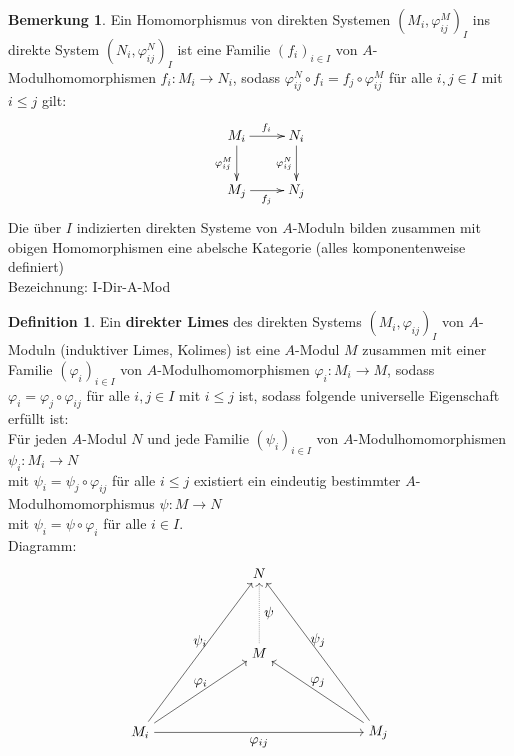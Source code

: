 \documentclass[10pt,a4paper,numbers=endperiod]{scrreprt}
\theoremstyle{definition}
\newtheorem{defi}[satz]{Definition}
\newtheorem{bem}[satz]{Bemerkung}
\begin{document}
\begin{bem}
	Ein Homomorphismus von direkten Systemen $(M_i, \varphi_{ij}^M)_I$ ins direkte System $(N_i, \varphi_{ij}^N)_I$ ist eine Familie $(f_i)_{i \in I}$ von $A$-Modulhomomorphismen $f_i: M_i \to N_i$, sodass $\varphi_{ij}^N \circ f_i = f_j \circ \varphi_{ij}^M$ für alle $i, j \in I$ mit $i \leq j$ gilt: \begin{align*}
		\begin{xy}
		\xymatrix{
			M_i \ar[r]^{f_i} \ar[d]_{\varphi_{ij}^M} & N_i \ar[d]_{\varphi_{ij}^N}\\
			M_j \ar[r]_{f_j} & N_j 
		}
		\end{xy}
	\end{align*}
	Die über $I$ indizierten direkten Systeme von $A$-Moduln bilden zusammen mit obigen Homomorphismen eine abelsche Kategorie (alles komponentenweise definiert)\\
	Bezeichnung: I-Dir-A-Mod
\end{bem}

\begin{defi}
	Ein \textbf{direkter Limes} des direkten Systems $(M_i, \varphi_{ij})_I$ von $A$-Moduln (induktiver Limes, Kolimes) ist eine $A$-Modul $M$ zusammen mit einer Familie $(\varphi_i)_{i \in I}$ von $A$-Modulhomomorphismen $\varphi_i: M_i \to M$, sodass $\varphi_i = \varphi_j \circ \varphi_{ij}$ für alle $i, j \in I$ mit $i \leq j$ ist, sodass folgende universelle Eigenschaft erfüllt ist:\\
	Für jeden $A$-Modul $N$ und jede Familie $(\psi_i)_{i \in I}$ von $A$-Modulhomomorphismen $\psi_i: M_i \to N$\\
	mit $\psi_i = \psi_j \circ \varphi_{ij}$ für alle $i \leq j$ existiert ein eindeutig bestimmter $A$-Modulhomomorphismus $\psi: M \to N$\\
	mit $\psi_i = \psi \circ \varphi_i$ für alle $i \in I$.\\
	Diagramm: \begin{align*}
	\begin{tikzpicture}{
		\node (01) at (5,6) {$ N $};
		\node (02) at (5,4) {$ M $};
		\node (03) at (2,2) {$ M_i $};
		\node (04) at (8,2) {$ M_j $};
		\draw[->] (04) edge node[above] {$ \psi_j $} (01);
		\draw[->] (03) edge node[above] {$ \varphi_i $} (02);
		\draw[->] (03) edge node[below] {$ \varphi_{ij} $} (04);
		\draw[->] (04) edge node[above] {$ \varphi_j $} (02);
		\draw[->, densely dotted] (02) edge node[right] {$ \psi $} (01);
		\draw[->] (03) edge node[above] {$ \psi_i $} (01);
	}
	\end{tikzpicture} 
	\end{align*}
\end{defi}
\end{document}
